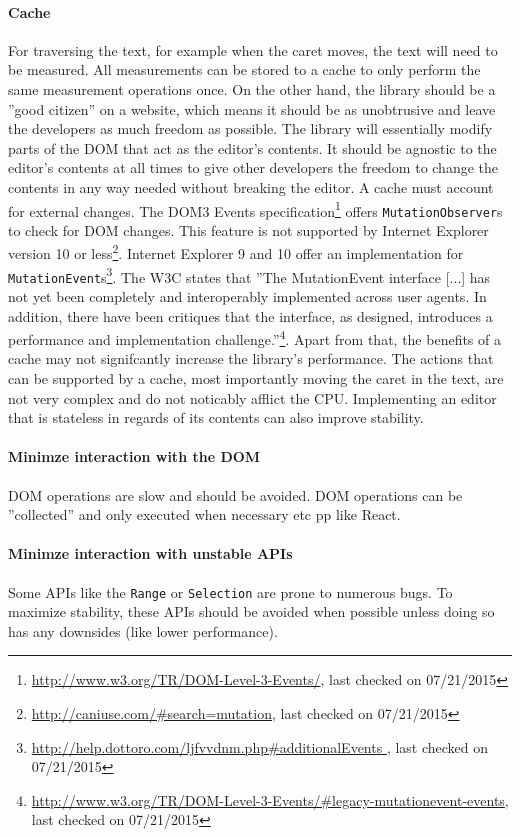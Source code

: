\paragraph{Cache} For traversing the text, for example when the caret moves, the text will need to be measured. All measurements can be stored to a cache to only perform the same measurement operations once. On the other hand, the library should be a ''good citizen'' on a website, which means it should be as unobtrusive and leave the developers as much freedom as possible. The library will essentially modify parts of the DOM that act as the editor's contents. It should be agnostic to the editor's contents at all times to give other developers the freedom to change the contents in any way needed without breaking the editor. A cache must account for external changes. The DOM3 Events specification\footnote{\url{http://www.w3.org/TR/DOM-Level-3-Events/}, last checked on 07/21/2015} offers \texttt{MutationObserver}s to check for DOM changes. This feature is not supported by Internet Explorer version 10 or less\footnote{\url{http://caniuse.com/\#search=mutation}, last checked on 07/21/2015}. Internet Explorer 9 and 10 offer an implementation for \texttt{MutationEvent}s\footnote{\url{http://help.dottoro.com/ljfvvdnm.php\#additionalEvents }, last checked on 07/21/2015}. The W3C states that ''The MutationEvent interface [...] has not yet been completely and interoperably implemented across user agents. In addition, there have been critiques that the interface, as designed, introduces a performance and implementation challenge.''\footnote{\url{http://www.w3.org/TR/DOM-Level-3-Events/\#legacy-mutationevent-events}, last checked on 07/21/2015}. Apart from that, the benefits of a cache may not signifcantly increase the library's performance. The actions that can be supported by a cache, most importantly moving the caret in the text, are not very complex and do not noticably afflict the CPU. Implementing an editor that is stateless in regards of its contents can also improve stability.


\paragraph{Minimze interaction with the DOM} DOM operations are slow and should be avoided. DOM operations can be ''collected'' and only executed when necessary etc pp like React.

\paragraph{Minimze interaction with unstable APIs} Some APIs like the \texttt{Range} or \texttt{Selection} are prone to numerous bugs. To maximize stability, these APIs should be avoided when possible unless doing so has any downsides (like lower performance).


